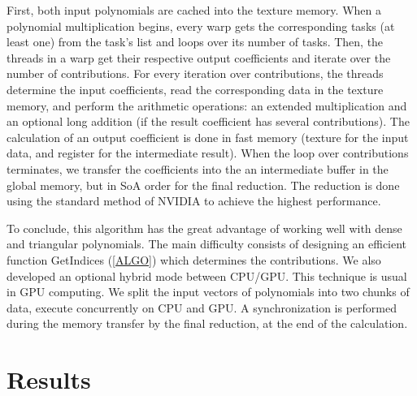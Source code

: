 \documentclass[oribibl]{llncs2e/llncs}
\begin{document}
 First, both input polynomials  are cached into the texture memory. 
When a polynomial multiplication begins,  every warp gets the corresponding tasks (at least one) from the task's list and loops over its number of tasks. Then,
the threads in a warp get their respective output coefficients and iterate over the number of  contributions.
For every iteration over contributions, the threads determine the input coefficients, read the corresponding data in the texture memory, and perform the arithmetic operations: an extended multiplication and an optional long addition (if the result coefficient has several contributions). The calculation of an output coefficient  is  done in fast memory (texture for the input data, and register for the intermediate result). 
When the loop over contributions terminates,  we transfer the coefficients into the an intermediate buffer in the global memory, but in SoA  order for the final reduction. 
The reduction is done using the standard method of NVIDIA \cite{CUDAReduction} to achieve the highest performance.


To conclude, this  algorithm has the great advantage of working well with dense and triangular polynomials. 
The main difficulty consists  of designing an efficient function GetIndices (\ref{ALGO}) which determines the contributions.
 We also developed an optional hybrid mode between CPU/GPU. This  technique is usual in GPU computing.
  We split the input vectors of polynomials into two chunks of data, execute concurrently on CPU and GPU. 
  A synchronization  is performed during  the memory transfer   by the final reduction, at the end of the calculation.

\section{Results}
\end{document}
